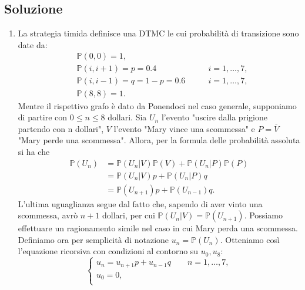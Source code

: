 \documentclass[
	12pt, %
]{fphw}
\begin{document}

\subsection*{Soluzione}

\begin{enumerate}
	\item La strategia timida definisce una DTMC le cui probabilità di transizione sono date da:
		\begin{equation*}
			\begin{aligned}
				&\mathbb{P}(0, 0) = 1,	\\
				&\mathbb{P}(i, i+1) = p = 0.4	\qquad &i = 1, \dots, 7,	\\
				&\mathbb{P}(i, i-1) = q = 1-p = 0.6	\qquad &i = 1, \dots, 7,	\\
				&\mathbb{P}(8, 8) = 1.
			\end{aligned}
		\end{equation*}
		Mentre il rispettivo grafo è dato da
		Ponendoci nel caso generale, supponiamo di partire con $0 \leq n \leq 8$ dollari.
		Sia $U_n$ l'evento "uscire dalla prigione partendo con n dollari", $V$ l'evento "Mary vince una scommessa" e $P = \overline{V}$ "Mary perde una scommessa".
		Allora, per la formula delle probabilità assoluta si ha che
		\begin{equation} \label{eq:es3_1}
			\begin{aligned}
				\mathbb{P}(U_n) &= \mathbb{P}(U_n | V)\mathbb{P}(V) + \mathbb{P}(U_n | P)\mathbb{P}(P) \\
					&= \mathbb{P}(U_n | V)p + \mathbb{P}(U_n | P)q \\
					&= \mathbb{P}(U_{n+1})p + \mathbb{P}(U_{n-1}) q.
			\end{aligned}
		\end{equation}
		L'ultima uguaglianza segue dal fatto che, sapendo di aver vinto una scommessa, avrò $n+1$ dollari, per cui $\mathbb{P}(U_n | V) = \mathbb{P}(U_{n+1})$.
		Possiamo effettuare un ragionamento simile nel caso in cui Mary perda una scommessa.
		Definiamo ora per semplicità di notazione $u_n = \mathbb{P}(U_n)$.
		Otteniamo così l'equazione ricorsiva con condizioni al contorno su $u_0, u_8$:
		\begin{equation*}
			\begin{cases}
				u_n = u_{n+1}p + u_{n-1}q \qquad n = 1, \dots, 7, \\
				u_0 = 0, \\

\end{cases}
\end{equation*}
\end{enumerate}
\end{document}
